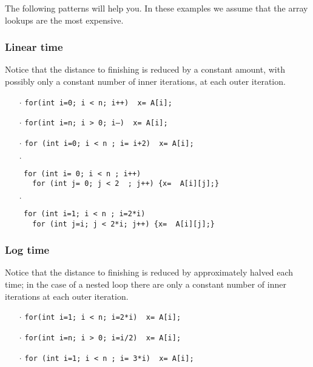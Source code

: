 \documentclass[twoside=false,DIV=14]{scrartcl}
\begin{document}
\begin{itemize}
The following patterns will help you. In these examples we assume that the array lookups are the most expensive.

\subsubsection*{Linear time}

Notice that the distance to finishing is reduced by a constant amount, with possibly only a constant number of inner iterations, at each outer iteration.
\begin{itemize}
\item [$\cdot$] {\tt for(int i=0; i < n; i++) { x=  A[i];}}

\item [$\cdot$] {\tt for(int i=n; i > 0; i--) { x=  A[i]; }}

\item [$\cdot$] {\tt for (int i=0; i < n ; i= i+2) { x=  A[i]; }}

\item [$\cdot$] \begin{verbatim}
 for (int i= 0; i < n ; i++) 
   for (int j= 0; j < 2  ; j++) {x=  A[i][j];} 
    \end{verbatim}

\item [$\cdot$]\begin{verbatim}
 for (int i=1; i < n ; i=2*i)
   for (int j=i; j < 2*i; j++) {x=  A[i][j];}
 \end{verbatim}
\end{itemize}


\subsubsection*{Log time}

Notice that the distance to finishing is reduced by approximately halved each time; in the case of a nested loop there are only a
constant number of inner iterations at each outer iteration.

\begin{itemize}
\item [$\cdot$] {\tt for(int i=1; i < n; i=2*i) { x= A[i]; }}

\item [$\cdot$] {\tt for(int i=n; i > 0; i=i/2) { x=  A[i]; }}

\item [$\cdot$] {\tt for (int i=1; i < n ; i= 3*i) { x=  A[i]; }}


\end{itemize}
\end{itemize}
\end{document}
